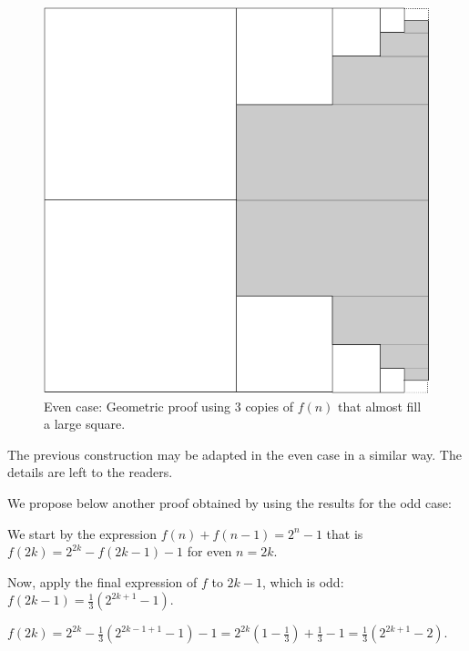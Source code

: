 \begin{figure} [h]
\begin{center}
        \includegraphics[scale=0.4]{FiguresMaths/alternatePowers2odd.png}
        \caption{Even case: Geometric proof using 3 copies of $f(n)$ that almost fill a large square.}
        \label{fig:alternatePowers2finalOdd}
\end{center}
\end{figure}

The previous construction may be adapted in the even case in a similar way.
The details are left to the readers. 

We propose below another proof obtained by using the results for the odd case:

We start by the expression $f(n) + f(n-1) = 2^n -1$
that is $f(2k) = 2^{2k} - f(2k-1) -1$ for even $n=2k$.

Now, apply the final expression of $f$ to $2k-1$, which is odd: $f(2k-1) = \frac{1}{3} (2^{2k+1}-1)$.

$f(2k) = 2^{2k} - \frac{1}{3} (2^{2k-1+1}-1) -1 = 2^{2k} (1-\frac{1}{3}) + \frac{1}{3} -1= \frac{1}{3} (2^{2k+1} -2)$.
\bigskip


